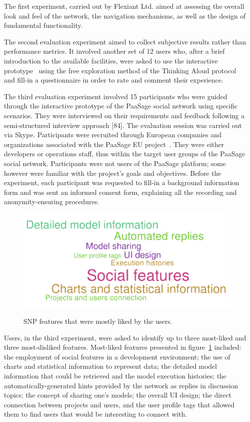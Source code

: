 The first experiment, carried out by Flexiant Ltd. aimed at assessing the overall look and feel of the network, the navigation mechanisms, as well as the design of fundamental functionality.

The second evaluation experiment aimed to collect subjective results rather than performance metrics. It involved another set of 12 users who, after a brief introduction to the available facilities, were asked to use the interactive prototype~\cite{Virzi1996} using the free exploration method of the Thinking Aloud protocol~\cite{jordan1998introduction} and fill-in a questionnaire in order to rate and comment their experience. 

The third evaluation experiment involved 15 participants who were guided through the interactive prototype of the PaaSage social network using specific scenarios. They were interviewed on their requirements and feedback following a semi-structured interview approach [84]. The evaluation session was carried out via Skype. Participants were recruited through European companies and organizations associated with the PaaSage EU project~\cite{paasage}. They were either developers or operations staff, thus within the target user groups of the PaaSage social network. Participants were not users of the PaaSage platform; some however were familiar with the project’s goals and objectives. Before the experiment, each participant was requested to fill-in a background information form and was sent an informed consent form, explaining all the recording and anonymity-ensuring procedures. 

\begin{figure}[h]
	\caption{SNP features that were mostly liked by the users.}
	\includegraphics[width=1\textwidth,natwidth=200,natheight=150]{./fig/most-liked.pdf}
	\centering
	\label{fig:most-liked}
\end{figure}

Users, in the third experiment, were asked to identify up to three most-liked and three most-disliked features. Most-liked features presented in figure~\ref{fig:most-liked} included: the employment of social features in a development environment; the use of charts and statistical information to represent data; the detailed model information that could be retrieved and the model execution histories; the automatically-generated hints provided by the network as replies in discussion topics; the concept of sharing one’s models; the overall UI design; the direct connection between projects and users, and the user profile tags that allowed them to find users that would be interesting to connect with.

